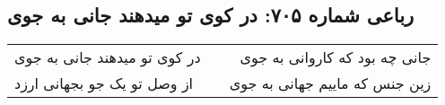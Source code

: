 \begin{center}
\section*{رباعی شماره ۷۰۵: در کوی تو میدهند جانی به جوی}
\label{sec:sh705}
\begin{longtable}{l p{0.5cm} r}
در کوی تو میدهند جانی به جوی
&&
جانی چه بود که کاروانی به جوی
\\
از وصل تو یک جو بجهانی ارزد
&&
زین جنس که ماییم جهانی به جوی
\\
\end{longtable}
\end{center}
